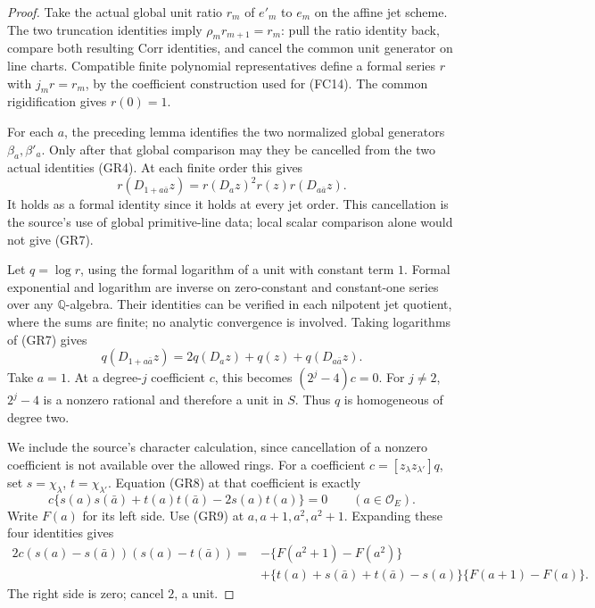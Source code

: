 \begin{proof}
Take the actual global unit ratio \(r_m\) of \(e'_m\)
to \(e_m\) on the affine jet scheme.
The two truncation identities imply
\(\rho_mr_{m+1}=r_m\): pull the ratio identity back,
compare both resulting \(\mathrm{Corr}\) identities,
and cancel the common unit generator on line charts.
Compatible finite polynomial representatives define a
formal series \(r\) with \(j_mr=r_m\), by the coefficient
construction used for (FC14).
The common rigidification gives \(r(0)=1\).

For each \(a\), the preceding lemma identifies the
two normalized global generators \(\beta_a,\beta'_a\).
Only after that global comparison may they be
cancelled from the two actual identities (GR4).
At each finite order this gives
\[
 r(D_{1+a\bar a}z)
                  =r(D_a z)^2r(z)r(D_{a\bar a}z).           \tag{GR7}
\]
It holds as a formal identity since it holds at every
jet order.
This cancellation is the source's use of global
primitive-line data; local scalar comparison alone
would not give (GR7).

Let \(q=\log r\), using the formal logarithm of a
unit with constant term \(1\).
Formal exponential and logarithm are inverse on
zero-constant and constant-one series over any
\(\mathbb Q\)-algebra.
Their identities can be verified in each nilpotent
jet quotient, where the sums are finite; no analytic
convergence is involved.
Taking logarithms of (GR7) gives
\[
 q(D_{1+a\bar a}z)
              =2q(D_a z)+q(z)+q(D_{a\bar a}z).              \tag{GR8}
\]
Take \(a=1\).  At a degree-\(j\) coefficient \(c\),
this becomes \((2^j-4)c=0\).
For \(j\ne2\), \(2^j-4\) is a nonzero rational and
therefore a unit in \(S\).
Thus \(q\) is homogeneous of degree two.

We include the source's character calculation, since
cancellation of a nonzero coefficient is not available
over the allowed rings.
For a coefficient \(c=[z_\lambda z_{\lambda'}]q\), set
\(s=\chi_\lambda\), \(t=\chi_{\lambda'}\).
Equation (GR8) at that coefficient is exactly
\[
 c\{s(a)s(\bar a)+t(a)t(\bar a)-2s(a)t(a)\}=0
                               \qquad(a\in\mathcal O_E).   \tag{GR9}
\]
Write \(F(a)\) for its left side.
Use (GR9) at \(a,a+1,a^2,a^2+1\).
Expanding these four identities gives
\[
 \begin{split}
 2c(s(a)-s(\bar a))(s(a)-t(\bar a))
  ={}&-\{F(a^2+1)-F(a^2)\}\\
    &+\{t(a)+s(\bar a)+t(\bar a)-s(a)\}
                                      \{F(a+1)-F(a)\}.
 \end{split}                                                   \tag{GR10}
\]
The right side is zero; cancel \(2\), a unit.


\end{proof}
